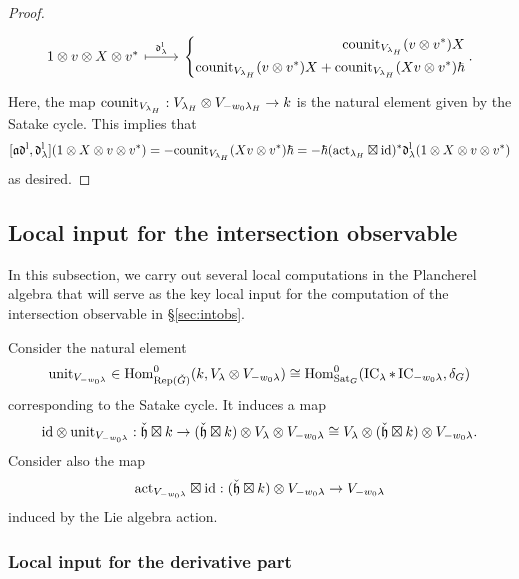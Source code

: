 \documentclass[reqno]{amsart}
\numberwithin{equation}{section}
\numberwithin{equation}{section}
\begin{document}
\begin{proof}
\begin{equation}
\begin{tikzcd}
        1\otimes v\otimes X\otimes v^* \ar[r, "\frd_{\lambda}^{\loc}", mapsto] 
        & \left\{
        \begin{aligned} 
            \counit_{V_{\lambda_H}}(v\otimes v^*) X \\ 
            \counit_{V_{\lambda_H}}(v\otimes v^*) X + \counit_{V_{\lambda_H}}(Xv\otimes v^*)\hbar 
        \end{aligned}
        \right.
        .
    \end{tikzcd} 
\end{equation}
    Here, the map $\mathrm{counit}_{V_{\lambda_H}}:V_{\lambda_H}\otimes V_{-w_0\lambda_H}\to k$ is the natural element given by the Satake cycle. This implies that \[[\mathfrak{a}\mathfrak{d}^{\mathrm{l}},\mathfrak{d}_{\lambda}^{\mathrm{l}}](1\otimes X\otimes v \otimes v^*)= -\mathrm{counit}_{V_{\lambda_H}}(Xv\otimes v^*) \hbar=-\hbar (\mathrm{act}_{\lambda_H}\boxtimes \mathrm{id})^*\mathfrak{d}_{\lambda}^{\mathrm{l}}(1\otimes X\otimes v \otimes v^*)\] as desired.

\end{proof}

\subsection{Local input for the intersection observable}
In this subsection, we carry out several local computations in the Plancherel algebra that will serve as the key local input for the computation of the intersection observable in \S\ref{sec:intobs}.

Consider the natural element \begin{equation}\mathrm{unit}_{V_{-w_0\lambda}}\in \operatorname{Hom}^0_{\operatorname{Rep}(\check{G})}(k, V_{\lambda}\otimes V_{-w_0\lambda})\cong \operatorname{Hom}^0_{\operatorname{Sat}_G}(\operatorname{IC}_{\lambda}*\operatorname{IC}_{-w_0\lambda},\delta_G)\end{equation} corresponding to the Satake cycle. It induces a map \begin{equation}\mathrm{id}\otimes \mathrm{unit}_{V_{-w_0\lambda}}:\check{\mathfrak{h}}\boxtimes k\to (\check{\mathfrak{h}}\boxtimes k)\otimes V_{\lambda}\otimes V_{-w_0\lambda}\cong V_{\lambda}\otimes(\check{\mathfrak{h}}\boxtimes k)\otimes V_{-w_0\lambda}.\end{equation} Consider also the map \[\mathrm{act}_{V_{-w_0\lambda}}\boxtimes \mathrm{id}: (\check{\mathfrak{h}}\boxtimes k)\otimes V_{-w_0\lambda}\to V_{-w_0\lambda} \] induced by the Lie algebra action.

\subsubsection{Local input for the derivative part}
\end{document}
